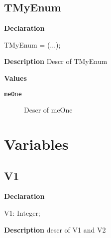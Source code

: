 \documentclass{report}
\newif\ifpdf
\begin{document}
\subsection*{TMyEnum}
\fi
\label{warning_back_comment-TMyEnum}
\begin{list}{}{
\setlength{\itemindent}{0cm}
\setlength{\listparindent}{0cm}
\setlength{\leftmargin}{\evensidemargin}
\addtolength{\leftmargin}{\tmplength}
\settowidth{\labelsep}{X}
\addtolength{\leftmargin}{\labelsep}
\setlength{\labelwidth}{\tmplength}
}
\item[\textbf{Declaration}\hfill]
\ifpdf
\begin{flushleft}
\fi
\begin{ttfamily}
TMyEnum = (...);\end{ttfamily}

\ifpdf
\end{flushleft}
\fi

\par
\item[\textbf{Description}]
Descr of TMyEnum\item[\textbf{Values}]
\begin{description}
\item[\texttt{meOne}] \label{warning_back_comment-meOne}
\index{}
Descr of meOne
\end{description}


\end{list}
\section{Variables}
\ifpdf
\subsection*{\large{\textbf{V1}}\normalsize\hspace{1ex}\hrulefill}
\else
\subsection*{V1}
\fi
\label{warning_back_comment-V1}
\begin{list}{}{
\setlength{\itemindent}{0cm}
\setlength{\listparindent}{0cm}
\setlength{\leftmargin}{\evensidemargin}
\addtolength{\leftmargin}{\tmplength}
\settowidth{\labelsep}{X}
\addtolength{\leftmargin}{\labelsep}
\setlength{\labelwidth}{\tmplength}
}
\item[\textbf{Declaration}\hfill]
\ifpdf
\begin{flushleft}
\fi
\begin{ttfamily}
V1: Integer;\end{ttfamily}

\ifpdf
\end{flushleft}
\fi

\par
\item[\textbf{Description}]
descr of V1 and V2

\end{list}
\ifpdf
\end{document}
